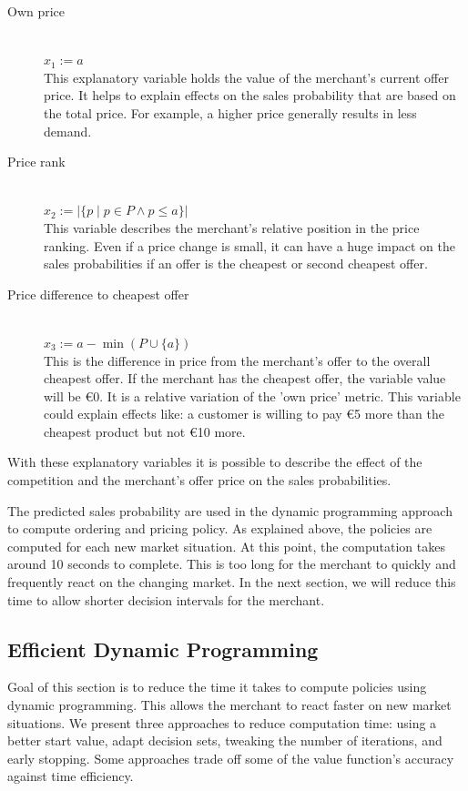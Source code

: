 \begin{description}
	\item [Own price] \hfill \\
		$x_1 := a$ \\
		This explanatory variable holds the value of the merchant's current offer price.
		It helps to explain effects on the sales probability that are based on the total price.
		For example, a higher price generally results in less demand.
	\item [Price rank] \hfill \\
		$x_2 := |\{p \mid p \in P \land p \leq a\}|$ \\
		This variable describes the merchant's relative position in the price ranking.
		Even if a price change is small, it can have a huge impact on the sales probabilities if an offer is the cheapest or second cheapest offer.
	\item [Price difference to cheapest offer] \hfill \\
		$x_3 := a - \min( P \cup \{a\})$ \\
		This is the difference in price from the merchant's offer to the overall cheapest offer.
		If the merchant has the cheapest offer, the variable value will be €0.
		It is a relative variation of the 'own price' metric.
		This variable could explain effects like: a customer is willing to pay €5 more than the cheapest product but not €10 more.
\end{description}

With these explanatory variables it is possible to describe the effect of the competition and the merchant's offer price on the sales probabilities.

The predicted sales probability are used in the dynamic programming approach to compute ordering and pricing policy.
As explained above, the policies are computed for each new market situation.
At this point, the computation takes around 10 seconds to complete.
This is too long for the merchant to quickly and frequently react on the changing market.
In the next section, we will reduce this time to allow shorter decision intervals for the merchant.


\subsection{Efficient Dynamic Programming}
\label{section:faster_dyn_prog}
Goal of this section is to reduce the time it takes to compute policies using dynamic programming.
This allows the merchant to react faster on new market situations.
We present three approaches to reduce computation time: using a better start value, adapt decision sets, tweaking the number of iterations, and early stopping.
Some approaches trade off some of the value function's accuracy against time efficiency.

